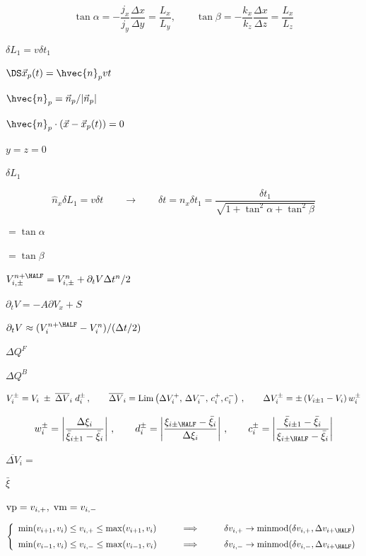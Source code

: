 \documentclass{article}
\begin{document}
\[    \tan\alpha = -\frac{j_x}{j_y}\frac{\Delta x}{\Delta y} = \frac{L_x}{L_y} ,
    \qquad
    \tan\beta  = -\frac{k_x}{k_z}\frac{\Delta x}{\Delta z} = \frac{L_x}{L_z}
\]
\pagebreak

$\delta L_1 = v\delta t_1$
\pagebreak

$\DS \vec{x}_p(t) = \hvec{n}_p vt$
\pagebreak

$ \hvec{n}_p = \vec{n}_p/|\vec{n}_p| $
\pagebreak

$ \hvec{n}_p\cdot(\vec{x}-\vec{x}_p(t)) = 0$
\pagebreak

$ y = z = 0 $
\pagebreak

$\delta L_1$
\pagebreak

\[    \hat{n}_x\delta L_1 = v\delta t
    \qquad\rightarrow\qquad
    \delta t = n_x\delta t_1 =
    \frac{\delta t_1}{\sqrt{1 + \tan^2\alpha + \tan^2\beta}}
\]
\pagebreak

$ = \tan\alpha$
\pagebreak

$ = \tan\beta $
\pagebreak

$ V_{i,\pm}^{n+\HALF} = V_{i,\pm}^n + \partial_t V \Delta t^n/2 $
\pagebreak

$ \partial_t V = -A\partial V_x + S $
\pagebreak

$ \partial_t V \approx (V^{n+\HALF}_i-V^n_i)/(\Delta t/2) $
\pagebreak

$\Delta Q^{F}$
\pagebreak

$\Delta Q^{B}$
\pagebreak

\[  V_i^{\pm} = V_i \;\pm\; \overline{\Delta V}_i \; d^\pm_i\,,
  \qquad
 \overline{\Delta V}_i = {\rm Lim}\left(\Delta V_i^+,\,\Delta V_i^-,\,
                                        c^+_i, c^-_i\right)\,,
 \qquad
   \Delta V^\pm_i = \pm\left(V_{i\pm1}-V_i\right)w^\pm_i
\]
\pagebreak

\[   w^\pm_i = \left|\frac{\Delta\xi_i}{\bar{\xi}_{i\pm1} - \bar{\xi}_i}\right| \,,
  \qquad
   d^\pm_i = \left|\frac{\xi_{i\pm\HALF} - \bar{\xi}_i}{\Delta\xi_i}\right|\,,
  \qquad
   c^\pm_i = \left|\frac{\bar{\xi}_{i\pm1} - \bar{\xi}_i}
                        {\xi_{i\pm\HALF}- \bar{\xi}_i}\right|
\]
\pagebreak

$\overline{\Delta V}_i=$
\pagebreak

$ \bar{\xi} $
\pagebreak

${\rm vp} = v_{i,+},\; {\rm vm} = v_{i,-} $
\pagebreak

\[    \left\{\begin{array}{lll}
         \min(v_{i+1},v_i) \le v_{i,+} \le \max(v_{i+1},v_i)
         & \qquad \Longrightarrow\qquad &
         \delta v_{i,+} \to {\rm minmod}(\delta v_{i,+}, \Delta v_{i+\HALF})
     \\ \noalign{\medskip}
         \min(v_{i-1},v_i) \le v_{i,-} \le \max(v_{i-1},v_i)
         & \qquad \Longrightarrow\qquad &
         \delta v_{i,-} \to {\rm minmod}(\delta v_{i,-}, \Delta v_{i+\HALF})
     \end{array}\right.
\]
\pagebreak
\end{document}
